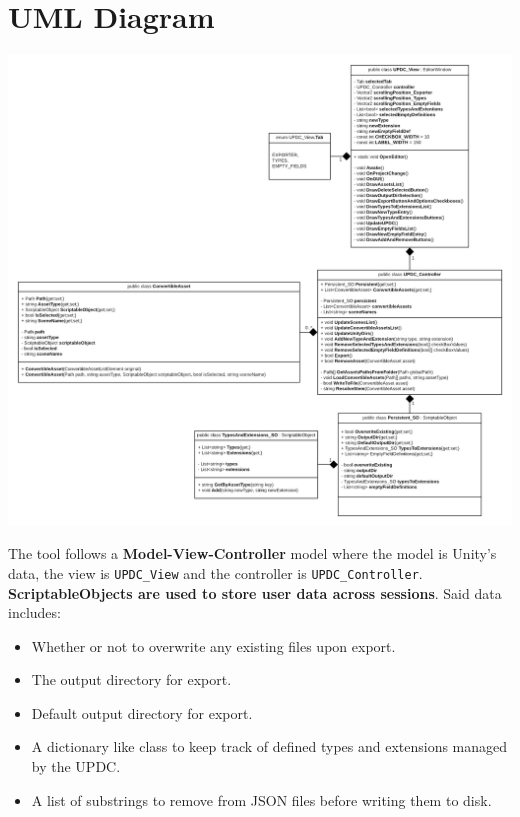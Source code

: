 \documentclass[12pt,a4paper]{article}
\begin{document}
\section{UML Diagram}
\begin{center}
\includegraphics[scale=0.275]{UMLUPDC}
\end{center}
\noindent The tool follows a \textbf{Model-View-Controller} model where the model is Unity's data, the view is \texttt{UPDC\_View} and the controller is \texttt{UPDC\_Controller}.\\
\textbf{ScriptableObjects are used to store user data across sessions}. Said data includes:
\begin{itemize}
\item Whether or not to overwrite any existing files upon export.
\item The output directory for export.
\item Default output directory for export.
\item A dictionary like class to keep track of defined types and extensions managed by the UPDC.
\item A list of substrings to remove from JSON files before writing them to disk.
\end{itemize}
\newpage
\end{document}
